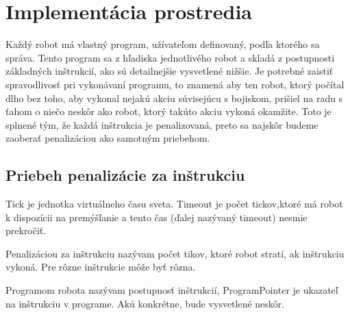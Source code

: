\chapter{Implementácia prostredia}
Každý robot má vlastný program, užívateľom definovaný, podľa ktorého sa správa. Tento program sa z hľadiska jednotlivého robot a skladá z postupnosti základných inštrukcií, ako sú detailnejšie vysvetlené nižšie. Je potrebné zaistiť spravodlivosť pri vykonávaní programu, to znamená aby ten robot, ktorý počítal dlho bez toho, aby vykonal nejakú akciu súvisejúcu s bojiskom, prišiel na radu s ťahom o niečo neskôr ako robot, ktorý takúto akciu vykoná okamžite. Toto je splnené tým, že každá inštrukcia je penalizovaná, preto sa najskôr budeme zaoberať penalizáciou ako samotným priebehom.
\section{Priebeh penalizácie za inštrukciu}
\begin{definicia}
Tick je jednotka virtuálneho času sveta. Timeout je počet tickov,ktoré má robot k dispozícii na premýšľanie a tento čas (ďalej nazývaný timeout) nesmie prekročiť.
\end{definicia}

\begin{definicia}
Penalizáciou za inštrukciu nazývam počet tikov, ktoré robot stratí, ak inštrukciu vykoná. Pre rôzne inštrukcie môže byť rôzna.
\end{definicia}

\begin{definicia}
Programom robota nazývam postupnosť inštrukcií, ProgramPointer je ukazateľ na inštrukciu v programe. Akú konkrétne, bude vysvetlené neskôr.
\end{definicia}


